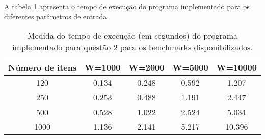 \documentclass[a4paper, 11pt]{article}
\begin{document}
A tabela \ref{tab:benchq2} apresenta o tempo de execução do programa implementado para os diferentes parâmetros de entrada.

\begin{table}[H]
\centering
\begin{tabular}{c|c|c|c|c}
Número de itens & W=1000 & W=2000 & W=5000 & W=10000 \\
\hline
120 & 0.134 & 0.248 & 0.592 & 1.207 \\
250 & 0.253 & 0.488 & 1.191 & 2.447 \\
500 & 0.528 & 1.022 & 2.524 & 5.034 \\
1000 & 1.136 & 2.141 & 5.217 & 10.396 \\
\end{tabular}
\caption{Medida do tempo de execução (em segundos) do programa implementado para questão 2 para os benchmarks disponibilizados.}
\label{tab:benchq2}
\end{table}
\end{document}
